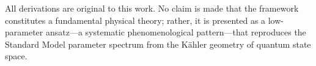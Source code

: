 All derivations are original to this work.  No claim is made that the
framework constitutes a fundamental physical theory; rather, it is presented
as a low-parameter ansatz---a systematic phenomenological pattern---that
reproduces the Standard Model parameter spectrum from the K\"{a}hler
geometry of quantum state space.
